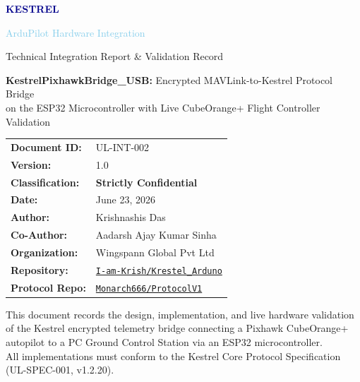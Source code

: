 \documentclass[11pt,a4paper]{article}
\begin{document}
\begin{titlepage}
    \centering
    \vspace*{1.5cm}
    {\Huge\bfseries\textcolor{darkblue}{KESTREL}\par}
    \vspace{0.4cm}
    {\LARGE\textcolor{skyblue}{ArduPilot Hardware Integration}\par}
    \vspace{0.4cm}
    {\large\textcolor{codegray}{Technical Integration Report \& Validation Record}\par}
    \vspace{1.5cm}

    {\large\textbf{KestrelPixhawkBridge\_USB:} Encrypted MAVLink-to-Kestrel Protocol Bridge\\
    on the ESP32 Microcontroller with Live CubeOrange+ Flight Controller Validation\par}

    \vspace{2cm}
    \begin{tabular}{ll}
        \textbf{Document ID:}    & UL-INT-002 \\[4pt]
        \textbf{Version:}        & 1.0 \\[4pt]
        \textbf{Classification:} & \textcolor{alertred}{\textbf{Strictly Confidential}} \\[4pt]
        \textbf{Date:}           & June 23, 2026 \\[4pt]
        \textbf{Author:}         & Krishnashis Das \\[4pt]
        \textbf{Co-Author:}      & Aadarsh Ajay Kumar Sinha \\[4pt]
        \textbf{Organization:}   & Wingspann Global Pvt Ltd \\[4pt]
        \textbf{Repository:}     & \href{https://github.com/I-am-Krish/Krestel_Arduno}
                                   {\texttt{I-am-Krish/Krestel\_Arduno}} \\[4pt]
        \textbf{Protocol Repo:}  & \href{https://github.com/Monarch666/ProtocolV1}
                                   {\texttt{Monarch666/ProtocolV1}}
    \end{tabular}

    \vfill
    {\footnotesize\textcolor{codegray}{This document records the design, implementation,
    and live hardware validation of the Kestrel encrypted telemetry bridge
    connecting a Pixhawk CubeOrange+ autopilot to a PC Ground Control Station
    via an ESP32 microcontroller.\\
    All implementations must conform to the Kestrel Core Protocol Specification
    (UL-SPEC-001, v1.2.20).}}
\end{titlepage}
\end{document}

